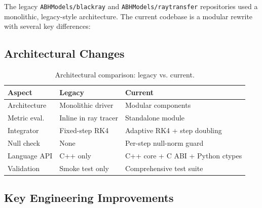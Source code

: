 \documentclass[11pt,twoside]{article}
\begin{document}
The legacy \texttt{ABHModels/blackray} and \texttt{ABHModels/raytransfer}
repositories used a monolithic, legacy-style architecture. The current codebase
is a modular rewrite with several key differences:

\subsection{Architectural Changes}

\begin{table}[H]
\centering
\begin{tabular}{lll}
\toprule
\textbf{Aspect} & \textbf{Legacy} & \textbf{Current} \\
\midrule
Architecture & Monolithic driver & Modular components \\
Metric eval. & Inline in ray tracer & Standalone module \\
Integrator & Fixed-step RK4 & Adaptive RK4 + step doubling \\
Null check & None & Per-step null-norm guard \\
Language API & C++ only & C++ core + C ABI + Python ctypes \\
Validation & Smoke test only & Comprehensive test suite \\
\bottomrule
\end{tabular}
\caption{Architectural comparison: legacy vs. current.}
\end{table}

\subsection{Key Engineering Improvements}
\end{document}
